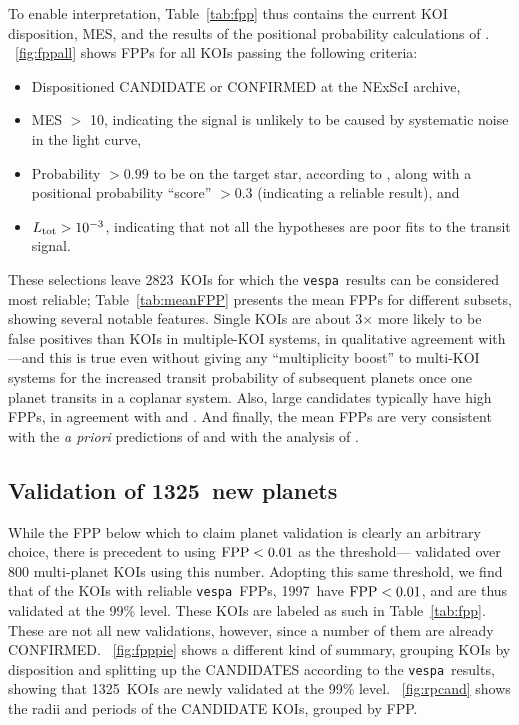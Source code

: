 \documentclass{emulateapj}
\newcommand{\figref}[1]{\ref{fig:#1}}
\newcommand{\Fig}[1]{\figurename~\figref{#1}}
\newcommand{\Tab}[1]{Table~\ref{tab:#1}}
\newcommand{\tab}[1]{\Tab{#1}}
\newcommand{\nreliable}{2823} %
\newcommand{\nval}{1997} %
\newcommand{\nvalnew}{1325} %
\newcommand{\posprobthresh}{0.3}
\newcommand{\vespa}{\texttt{vespa}}
\begin{document}
To enable interpretation, \tab{fpp} thus contains the current KOI
disposition, MES, and the results of the positional probability calculations
of \citet{Bryson:KSCI}.  \Fig{fppall} shows FPPs for all KOIs passing
the following criteria:
\begin{itemize}
\item Dispositioned CANDIDATE or CONFIRMED at the NExScI archive,
\item MES $>$ 10, indicating the signal is unlikely to be caused by 
      systematic noise in the light curve,
\item Probability $> 0.99$ to be on the target star, according
  to \citet{Bryson:KSCI}, along with a positional probability
  ``score'' $> \posprobthresh$ (indicating a reliable result), and   
\item $L_{\rm tot} > 10^{-3}$, indicating that not all the hypotheses are
  poor fits to the transit signal.
\end{itemize}

These selections leave \nreliable\ KOIs for which the \vespa\ results
can be considered most reliable;  \Tab{meanFPP} presents the mean FPPs
for different subsets, showing several notable features.  Single KOIs
are about 3$\times$ more likely to be false positives than KOIs in
multiple-KOI systems, in qualitative agreement with
\citet{Lissauer:2012}---and this is true even without giving any
``multiplicity boost'' to multi-KOI systems for the increased transit
probability of subsequent planets once one planet transits in a
coplanar system.  Also, large candidates typically have high FPPs, in
agreement with \citet{Santerne:2012} and \citet{Santerne:2015}.  And
finally, the mean FPPs are very consistent with the \textit{a priori}
predictions of \citet{Morton:2011b} and with the analysis of
\citet{Fressin:2013}.

\subsection{Validation of \nvalnew\ new planets}

While the FPP below which to claim planet validation is clearly
an arbitrary choice, there is precedent to using ${\rm FPP} <0.01$ as 
the threshold---\citet{Rowe:2014} validated over 800 multi-planet KOIs
using this number.  Adopting this same threshold, we find that 
of the KOIs with reliable \vespa\ FPPs, \nval\ have ${\rm FPP}
<0.01$, and are thus validated at the 99\% level.  
These KOIs are labeled as such in \tab{fpp}.  These are not all new validations,
however, since a number of them are already CONFIRMED. \Fig{fpppie}
shows a different kind of summary, grouping KOIs by disposition and
splitting up the CANDIDATES according to the \vespa\ results, showing
that \nvalnew\ KOIs are newly validated at the 99\% level.
\Fig{rpcand} shows the radii and periods of the CANDIDATE KOIs,
grouped by FPP.
\end{document}
